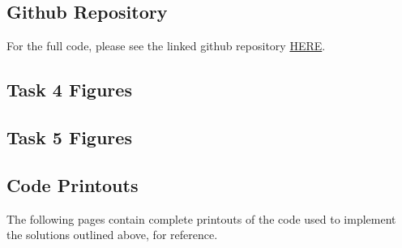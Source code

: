 \documentclass[conference]{IEEEtran}
\begin{document}
%




\newpage
\appendix

\printbibliography


\onecolumn
\subsection{Github Repository}

For the full code, please see the linked github repository \href{https://github.com/jjpendlebury/AINT308-Coursework}{HERE}.
\subsection{Task 4 Figures}\label{app:T4}


\subsection{Task 5 Figures}\label{app:T5}

\subsection{Code Printouts}
The following pages contain complete printouts of the code used to implement the solutions outlined above, for reference.
%
%
%
\end{document}
